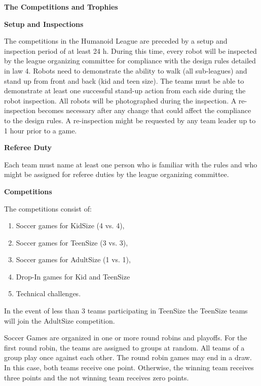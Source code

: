 \clearpage
\sffamily
{\bfseries\color[rgb]{0.4,0.4,0.4}The Competitions and Trophies}

\bigskip

{\bfseries Setup and Inspections}

\headlinebox

The competitions in the Humanoid League are preceded by a setup and inspection period of at least 24 h. During this time, every robot will be inspected by the league organizing committee for compliance with the design rules detailed in law 4. Robots need to demonstrate the ability to walk (all sub-leagues) and stand up from front and back (kid and teen size). The teams must be able to demonstrate at least one successful stand-up action from each side during the robot inspection. All robots will be photographed during the inspection. A re-inspection becomes necessary after any change that could affect the compliance to the design rules. A re-inspection might be requested by any team leader up to 1 hour prior to a game.

\bigskip

{\bfseries Referee Duty}

\headlinebox

Each team must name at least one person who is familiar with the rules and who might be assigned for referee duties by the league organizing committee.

\bigskip

{\bfseries Competitions}

\headlinebox

The competitions consist of:

\begin{enumerate}
\item Soccer games for KidSize (4 vs. 4),
\item Soccer games for TeenSize (3 vs. 3),
\item Soccer games for AdultSize (1 vs. 1),
\item Drop-In games for Kid and TeenSize
\item Technical challenges.
\end{enumerate}

\bigskip

In the event of less than 3 teams participating in TeenSize the TeenSize teams will join the AdultSize competition.

\bigskip

Soccer Games are organized in one or more round robins and playoffs. For the first round robin, the teams are assigned to groups at random. All teams of a group play once against each other. The round robin games may end in a draw. In this case, both teams receive one point. Otherwise, the winning team receives three points and the not winning team receives zero points.

